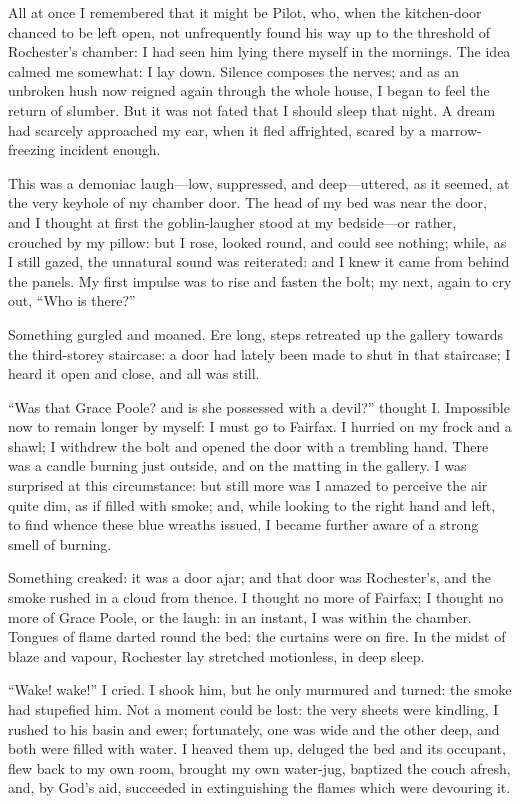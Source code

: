 All at once I remembered that it might be Pilot, who, when the
kitchen-door chanced to be left open, not unfrequently found his way up
to the threshold of \Mr{}  Rochester's chamber: I had seen him lying there
myself in the mornings. The idea calmed me somewhat: I lay down. 
Silence composes the nerves; and as an unbroken hush now reigned again
through the whole house, I began to feel the return of slumber. But it
was not fated that I should sleep that night. A dream had scarcely
approached my ear, when it fled affrighted, scared by a marrow-freezing
incident enough.

This was a demoniac laugh---low, suppressed, and deep---uttered, as it
seemed, at the very keyhole of my chamber door. The head of my bed was
near the door, and I thought at first the goblin-laugher stood at my
bedside---or rather, crouched by my pillow: but I rose, looked round,
and could see nothing; while, as I still gazed, the unnatural sound was
reiterated: and I knew it came from behind the panels. My first impulse
was to rise and fasten the bolt; my next, again to cry out, \enquote{Who
is there?}

Something gurgled and moaned. Ere long, steps retreated up the gallery
towards the third-storey staircase: a door had lately been made to shut
in that staircase; I heard it open and close, and all was still.

\enquote{Was that Grace Poole? and is she possessed with a devil?}
thought I\@. Impossible now to remain longer by myself: I must go to \Mrs{}
Fairfax. I hurried on my frock and a shawl; I withdrew the bolt and
opened the door with a trembling hand. There was a candle burning just
outside, and on the matting in the gallery. I was surprised at this
circumstance: but still more was I amazed to perceive the air quite dim,
as if filled with smoke; and, while looking to the right hand and left,
to find whence these blue wreaths issued, I became further aware of a
strong smell of burning.

Something creaked: it was a door ajar; and that door was \Mr{}
 Rochester's, and the smoke rushed in a cloud from thence. I thought no
more of \Mrs{} Fairfax; I thought no more of Grace Poole, or the laugh: in
an instant, I was within the chamber. Tongues of flame darted round the
bed: the curtains were on fire. In the midst of blaze and vapour, \Mr{}
 Rochester lay stretched motionless, in deep sleep.

\enquote{Wake! wake!} I cried. I shook him, but he only murmured and
turned: the smoke had stupefied him. Not a moment could be lost: the
very sheets were kindling, I rushed to his basin and ewer; fortunately,
one was wide and the other deep, and both were filled with water. I
heaved them up, deluged the bed and its occupant, flew back to my own
room, brought my own water-jug, baptized the couch afresh, and, by God's
aid, succeeded in extinguishing the flames which were devouring it.

